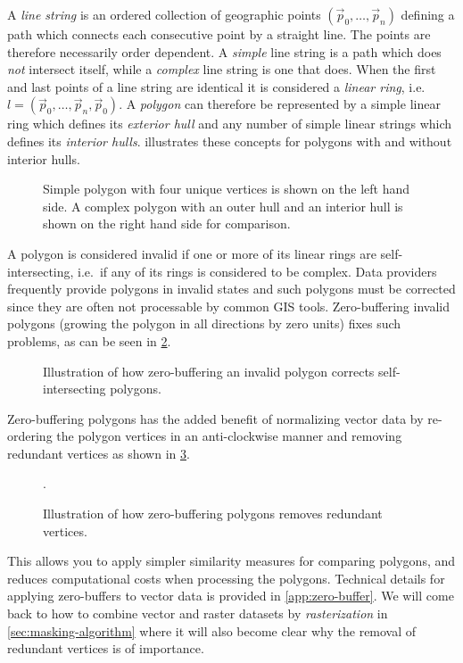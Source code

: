 A \textit{line string} is an ordered collection of geographic points $(\vec{p}_0, \ldots, \vec{p}_n)$ defining a path which connects each consecutive point by a straight line.
The points are therefore necessarily order dependent.
A \textit{simple} line string is a path which does \textit{not} intersect itself, while a \textit{complex} line string is one that does.
When the first and last points of a line string are identical it is considered a \textit{linear ring}, i.e.\ $l = (\vec{p}_0, \ldots, \vec{p}_n, \vec{p}_0)$.
A \textit{polygon} can therefore be represented by a simple linear ring which defines its \textit{exterior hull} and any number of simple linear strings which defines its \textit{interior hulls}.
 illustrates these concepts for polygons with and without interior hulls. %

\begin{figure}[H]
  \centering
  
  \textcolor{gray}{\vrule}
  \hspace{0.01\linewidth}
  
  \caption[Types of vectorized polygons.]{%
    Simple polygon with four unique vertices is shown on the left hand side.
    A complex polygon with an outer hull
    and an interior hull is shown on the right hand side for comparison.
  }%
  \label{fig:polygon-representation}
\end{figure}

A polygon is considered invalid if one or more of its linear rings are self-intersecting, i.e.\ if any of its rings is considered to be complex.
Data providers frequently provide polygons in invalid states and such polygons must be corrected since they are often not processable by common GIS tools.
Zero-buffering invalid polygons (growing the polygon in all directions by zero units) fixes such problems, as can be seen in \cref{fig:complex-zero-buffer}.

\begin{figure}[H]
  \centering
  
  \caption{Illustration of how zero-buffering an invalid polygon corrects self-intersecting polygons.}%
  \label{fig:complex-zero-buffer}
\end{figure}

Zero-buffering polygons has the added benefit of normalizing vector data by re-ordering the polygon vertices in an anti-clockwise manner and removing redundant vertices as shown in \cref{fig:redundant-zero-buffer}.

\begin{figure}[H]
  \centering
  
  \caption{Illustration of how zero-buffering polygons removes redundant vertices.}%
  \label{fig:redundant-zero-buffer}.
\end{figure}

This allows you to apply simpler similarity measures for comparing polygons, and reduces computational costs when processing the polygons.
Technical details for applying zero-buffers to vector data is provided in \cref{app:zero-buffer}.
We will come back to how to combine vector and raster datasets by \textit{rasterization} in \cref{sec:masking-algorithm} where it will also become clear why the removal of redundant vertices is of importance.
